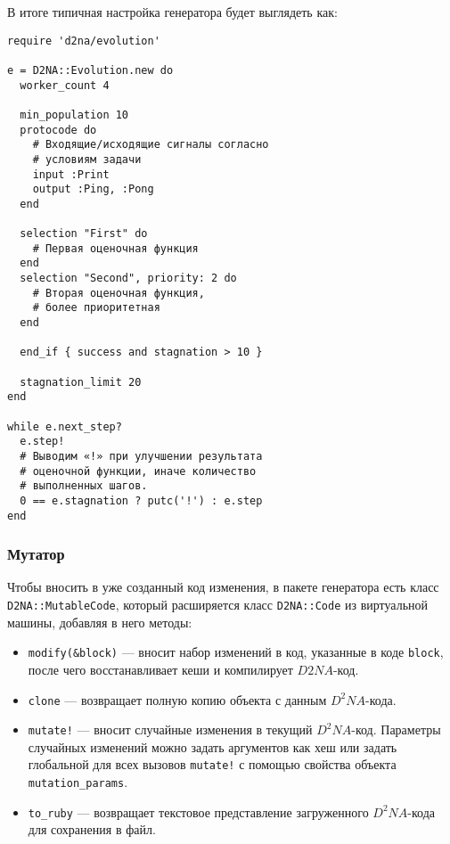 \documentclass[utf8,a5paper,portrait,10pt,twoside]{eskdtext}
\begin{document}
\newpage
В итоге типичная настройка генератора будет выглядеть как:
\begin{verbatim}
require 'd2na/evolution'

e = D2NA::Evolution.new do
  worker_count 4
  
  min_population 10
  protocode do
    # Входящие/исходящие сигналы согласно
    # условиям задачи
    input :Print
    output :Ping, :Pong
  end
  
  selection "First" do
    # Первая оценочная функция
  end
  selection "Second", priority: 2 do
    # Вторая оценочная функция,
    # более приоритетная
  end
  
  end_if { success and stagnation > 10 }
  
  stagnation_limit 20
end

while e.next_step?
  e.step!
  # Выводим «!» при улучшении результата
  # оценочной функции, иначе количество
  # выполненных шагов.
  0 == e.stagnation ? putc('!') : e.step
end
\end{verbatim}

\subsubsection{Мутатор}

Чтобы вносить в уже созданный код изменения, в пакете генератора есть класс
\texttt{D2NA::MutableCode}, который расширяется класс \texttt{D2NA::Code} из
виртуальной машины, добавляя в него методы:
\begin{itemize}
  \item \texttt{modify(\&block)} — вносит набор изменений в код, указанные в
        коде \texttt{block}, после чего восстанавливает кеши и компилирует
        $D2NA$-код.
  \item \texttt{clone} — возвращает полную копию объекта с данным $D^2NA$-кода.
  \item \texttt{mutate!} — вносит случайные изменения в текущий $D^2NA$-код.
        Параметры случайных изменений можно задать аргументов как хеш или
        задать глобальной для всех вызовов \texttt{mutate!} с помощью свойства
        объекта \texttt{mutation\_params}.
  \item \texttt{to\_ruby} — возвращает текстовое представление загруженного
        $D^2NA$-кода для сохранения в файл.
\end{itemize}
\end{document}
